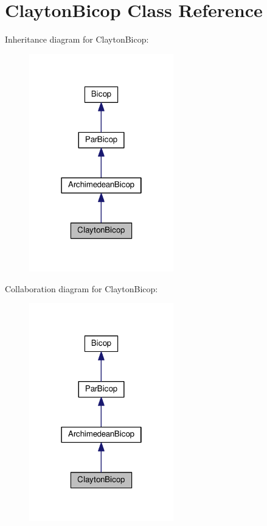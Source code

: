 \hypertarget{class_clayton_bicop}{}\section{Clayton\+Bicop Class Reference}
\label{class_clayton_bicop}


Inheritance diagram for Clayton\+Bicop\+:\nopagebreak
\begin{figure}[H]
\begin{center}
\leavevmode
\includegraphics[width=178pt]{class_clayton_bicop__inherit__graph}
\end{center}
\end{figure}


Collaboration diagram for Clayton\+Bicop\+:\nopagebreak
\begin{figure}[H]
\begin{center}
\leavevmode
\includegraphics[width=178pt]{class_clayton_bicop__coll__graph}
\end{center}
\end{figure}
